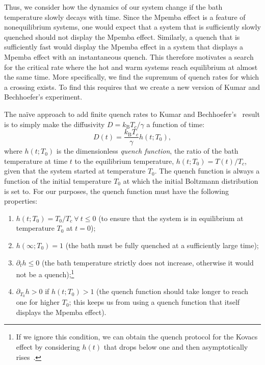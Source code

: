\documentclass[hyperref={colorlinks=true, urlcolor=blue, citecolor=blue, final, bound}]{sfuthesis}
\newcommand{\kB}{k_{\mathrm{B}}}
\begin{document}
Thus, we consider how the dynamics of our system change if the bath temperature slowly decays with time. Since the Mpemba effect is a feature of nonequilibrium systems, one would expect that a system that is sufficiently slowly quenched should not display the Mpemba effect. Similarly, a quench that is sufficiently fast would display the Mpemba effect in a system that displays a Mpemba effect with an instantaneous quench. This therefore motivates a search for the critical rate where the hot and warm systems reach equilibrium at almost the same time. More specifically, we find the supremum of quench rates for which a crossing exists. To find this requires that we create a new version of Kumar and Bechhoefer's experiment.

The na\"ive approach to add finite quench rates to Kumar and Bechhoefer's~\cite{Kumar2020} result is to simply make the diffusivity $D = \kB T_c/\gamma$ a function of time:
\begin{equation}
    D(t) = \frac{\kB T_c}{\gamma}h(t; T_0),
\end{equation}
where $h(t; T_0)$ is the dimensionless \textit{quench function}, the ratio of the bath temperature at time $t$ to the equilibrium temperature, $h(t; T_0) = T(t)/T_c$, given that the system started at temperature $T_0$. The quench function is always a function of the initial temperature $T_0$ at which the initial Boltzmann distribution is set to. For our purposes, the quench function must have the following properties:
\begin{enumerate}
    \item $h(t; T_0)=T_0/T_c\ \forall\ t\leq 0$ (to ensure that the system is in equilibrium at temperature $T_0$ at $t=0$);
    \item $h(\infty; T_0) = 1$ (the bath must be fully quenched at a sufficiently large time);
    \item $\partial_t{h} \leq 0$ (the bath temperature strictly does not increase, otherwise it would not be a quench);\footnote{If we ignore this condition, we can obtain the quench protocol for the Kovacs effect by considering $h(t)$ that drops below one and then asymptotically rises~\cite{Militaru2021}.}
    \item $\partial_{T_0}{h} > 0$ if $h(t;T_0)>1$ (the quench function should take longer to reach one for higher $T_0$; this keeps us from using a quench function that itself displays the Mpemba effect).
\end{enumerate}
\end{document}
